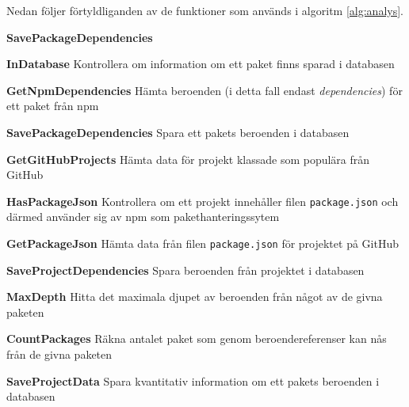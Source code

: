 Nedan följer förtyldliganden av de funktioner som används i algoritm \ref{alg:analys}.

\begin{labeling}{\textbf{SavePackageDependencies}}
  \item [\textbf{InDatabase}] Kontrollera om information om ett paket finns sparad i databasen
  \item [\textbf{GetNpmDependencies}] Hämta beroenden (i detta fall endast \textit{dependencies}) för ett paket från npm
  \item [\textbf{SavePackageDependencies}] Spara ett pakets beroenden i databasen
  \item [\textbf{GetGitHubProjects}] Hämta data för projekt klassade som populära från GitHub
  \item [\textbf{HasPackageJson}] Kontrollera om ett projekt innehåller filen \texttt{package.json} och därmed använder sig av npm som pakethanteringssytem
  \item [\textbf{GetPackageJson}] Hämta data från filen \texttt{package.json} för projektet på GitHub
  \item [\textbf{SaveProjectDependencies}] Spara beroenden från projektet i databasen
  \item [\textbf{MaxDepth}] Hitta det maximala djupet av beroenden från något av de givna paketen
  \item [\textbf{CountPackages}] Räkna antalet paket som genom beroendereferenser kan nås från de givna paketen
  \item [\textbf{SaveProjectData}] Spara kvantitativ information om ett pakets beroenden i databasen
\end{labeling}
